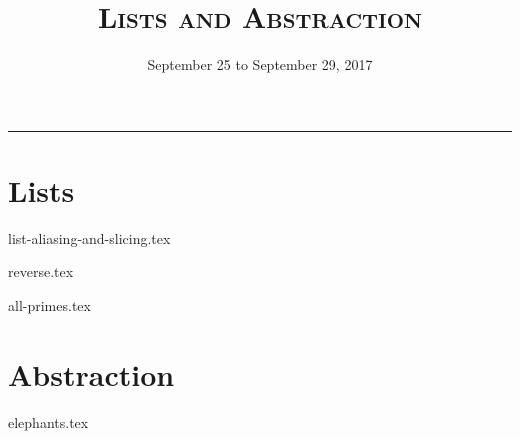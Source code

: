 \documentclass{exam}
\title{\textsc{Lists and Abstraction}}
\date{September 25 to September 29, 2017}
\begin{document}
\maketitle
\rule{\textwidth}{0.15em}
\fontsize{12}{15}\selectfont


\section{Lists}
\begin{questions}
{list-aliasing-and-slicing.tex}

\begin{blocksection}
{reverse.tex}
\end{blocksection}

\begin{blocksection}
{all-primes.tex}
\end{blocksection}

\section{Abstraction}
{elephants.tex}

\end{questions}
\end{document}
